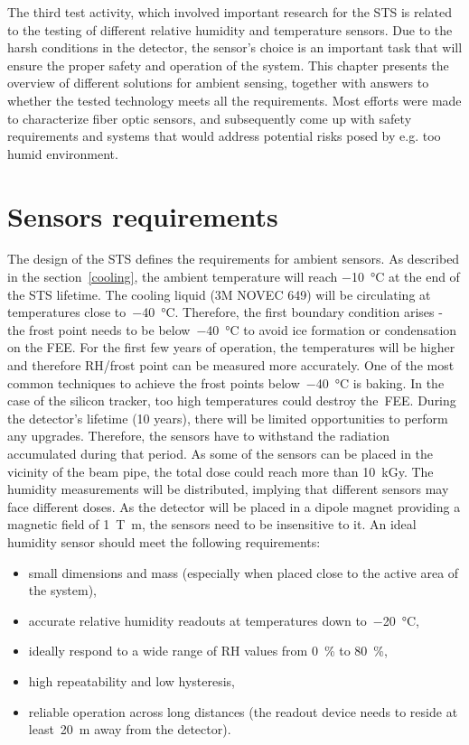The third test activity, which involved important research for the \gls{STS} is related to the testing of different relative humidity and temperature sensors. Due to the harsh conditions in the detector, the sensor's choice is an important task that will ensure the proper safety and operation of the system. This chapter presents the overview of different solutions for ambient sensing, together with answers to whether the tested technology meets all the requirements. Most efforts were made to characterize fiber optic sensors, and subsequently come up with safety requirements and systems that would address potential risks posed by e.g. too humid environment. 

\section{Sensors requirements}

The design of the \gls{STS} \cite{Heuser:54798} defines the requirements for ambient sensors. As described in the section~\ref{cooling}, the ambient temperature will reach \SI{-10}{\celsius} at the end of the \gls{STS} lifetime. The cooling liquid (3M NOVEC 649) will be circulating at temperatures close to~\SI{-40}{\celsius}. Therefore, the first boundary condition arises - the frost point needs to be below~\SI{-40}{\celsius} to avoid ice formation or condensation on the \gls{FEE}. For the first few years of operation, the temperatures will be higher and therefore RH/frost point can be measured more accurately. One of the most common techniques to achieve the frost points below~\SI{-40}{\celsius} is baking. In the case of the silicon tracker, too high temperatures could destroy the~\gls{FEE}. 
During the detector's lifetime (10 years), there will be limited opportunities to perform any upgrades. Therefore, the sensors have to withstand the radiation accumulated during that period. As some of the sensors can be placed in the vicinity of the beam pipe, the total dose could reach more than 10~kGy. The humidity measurements will be distributed, implying that different sensors may face different doses. As the detector will be placed in a dipole magnet providing a magnetic field of \SI{1}{\tesla\metre}, the sensors need to be insensitive to it. An ideal humidity sensor should meet the following requirements:
\begin{itemize}
    \item small dimensions and mass (especially when placed close to the active area of the system),
    \item accurate relative humidity readouts at temperatures down to~\SI{-20}{\celsius}, 
    \item ideally respond to a wide range of \gls{RH} values from 0~\% to 80~\%,
    \item high repeatability and low hysteresis,
    \item reliable operation across long distances (the readout device needs to reside at least~\SI{20}{\metre} away from the detector).
\end{itemize}

